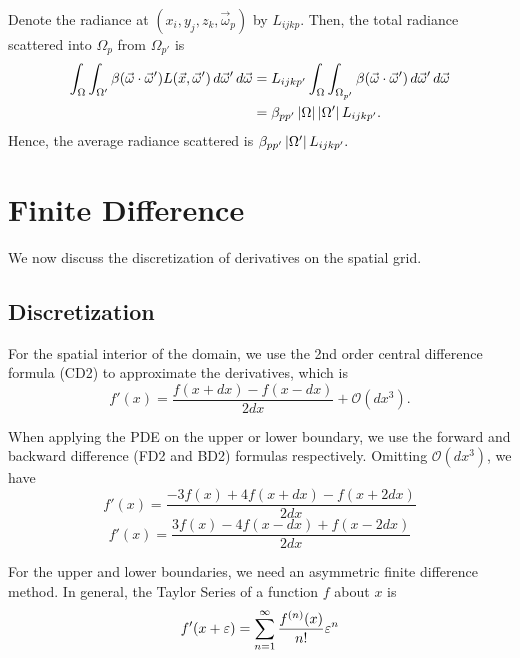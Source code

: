 Denote the radiance at $(x_i, y_j, z_k, \vec{\omega}_p)$ by $L_{ijkp}$.
Then, the total radiance scattered into $\Omega_p$ from $\Omega_{p'}$ is
\begin{align}
  \int_{\Omega}\int_{\Omega'}\beta(\vec{\omega} \cdot \vec{\omega}')L(\vec{x},\vec{\omega}')\, d\vec{\omega}'\, d\vec{\omega}
  &= L_{ijkp'} \int_\Omega\int_{\Omega_{p'}} \beta(\vec{\omega} \cdot \vec{\omega}')\, d\vec{\omega}'\, d\vec{\omega} \\
  &= \beta_{pp'}\left| \Omega \right|\left| \Omega' \right|L_{ijkp'}.
\end{align}
Hence, the average radiance scattered is $\beta_{pp'}\left| \Omega' \right|L_{ijkp'}.$

\section{Finite Difference}

We now discuss the discretization of derivatives on the spatial grid.

\subsection{Discretization}

For the spatial interior of the domain, we use the 2nd order central difference formula (CD2) to approximate the derivatives, which is
\begin{equation}
    \tag{CD2}
    f'(x) = \frac{f(x+dx)-f(x-dx)}{2dx} + \mathcal{O}(dx^3).
\end{equation}

When applying the PDE on the upper or lower boundary, we use the forward and backward difference (FD2 and BD2) formulas respectively.
Omitting $\mathcal{O}(dx^3)$, we have
\begin{equation}
    \tag{FD2}
    \label{eq:FD2}
    f'(x) = \frac{-3f(x)+4f(x+dx)-f(x+2dx)}{2dx}
\end{equation}
\begin{equation}
    \tag{BD2}
    \label{eq:BD2}
    f'(x) = \frac{3f(x)-4f(x-dx)+f(x-2dx)}{2dx}
\end{equation}

For the upper and lower boundaries, we need an asymmetric finite difference
method.
In general, the Taylor Series of a function $f$ about $x$ is
\begin{equation}
  f'(x+\varepsilon) = \sum_{n=1}^\infty \frac{f^{(n)}(x)}{n!} \varepsilon^n \\
\end{equation}

